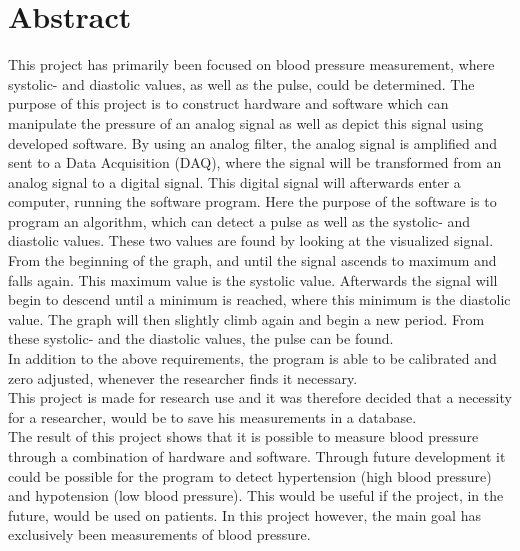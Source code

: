 \chapter{Abstract} 
This project has primarily been focused on blood pressure measurement, where systolic- and diastolic values, as well as the pulse, could be determined. The purpose of this project is to construct hardware and software which can manipulate the pressure of an analog signal as well as depict this signal using developed software. By using an analog filter, the analog signal is amplified and sent to a Data Acquisition (DAQ), where the signal will be transformed from an analog signal to a digital signal. This digital signal will afterwards enter a computer, running the software program. Here the purpose of the software is to program an algorithm, which can detect a pulse as well as the systolic- and diastolic values. These two values are found by looking at the visualized signal.  From the beginning of the graph, and until the signal ascends to maximum and falls again. This maximum value is the systolic value. Afterwards the signal will begin to descend until a minimum is reached, where this minimum is the diastolic value. The graph will then slightly climb again and begin a new period. From these systolic- and the diastolic values, the pulse can be found.\\
In addition to the above requirements, the program is able to be calibrated and zero adjusted, whenever the researcher finds it necessary. \\
This project is made for research use and it was therefore decided that a necessity for a researcher, would be to save his measurements in a database. \\
The result of this project shows that it is possible to measure blood pressure through a combination of hardware and software. Through future development it could be possible for the program to detect hypertension (high blood pressure) and hypotension (low blood pressure). This would be useful if the project, in the future, would be used on patients. In this project however, the main goal has exclusively been measurements of blood pressure. 
